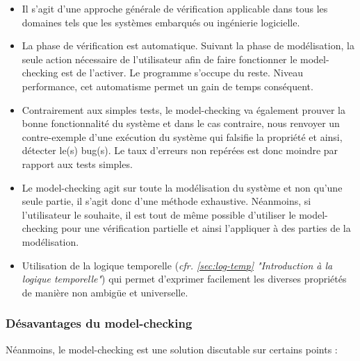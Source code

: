 \documentclass[runningheads,a4paper,10pt]{llncs}
\begin{document}
\begin{itemize}
\item Il s'agit d'une approche générale de vérification applicable dans tous les domaines tels que les systèmes embarqués ou ingénierie logicielle. 
\item La phase de vérification est automatique. Suivant la phase de modélisation, la seule action nécessaire de l'utilisateur afin de faire fonctionner le model-checking est de l'activer. Le programme s'occupe du reste. Niveau performance, cet automatisme permet un gain de temps conséquent. 
\item Contrairement aux simples tests, le model-checking va également prouver la bonne fonctionnalité du système et dans le cas contraire, nous renvoyer un contre-exemple d'une exécution du système qui falsifie la propriété et ainsi, détecter le(s) bug(s). Le taux d'erreurs non repérées est donc moindre par rapport aux tests simples. 
\item Le model-checking agit sur toute la modélisation du système et non qu'une seule partie, il s'agit donc d'une méthode exhaustive. Néanmoins, si l'utilisateur le souhaite, il est tout de même possible d'utiliser le model-checking pour une vérification partielle et ainsi l'appliquer à des parties de la modélisation. 
\item Utilisation de la logique temporelle (\textit{cfr. \autoref{sec:log-temp} "Introduction à la logique temporelle"}) qui permet d'exprimer facilement les diverses propriétés de manière non ambigüe et universelle. 
\end{itemize}

\subsubsection{Désavantages du model-checking} \label{sec:desavantages}

Néanmoins, le model-checking est une solution discutable sur certains points : 
\end{document}
